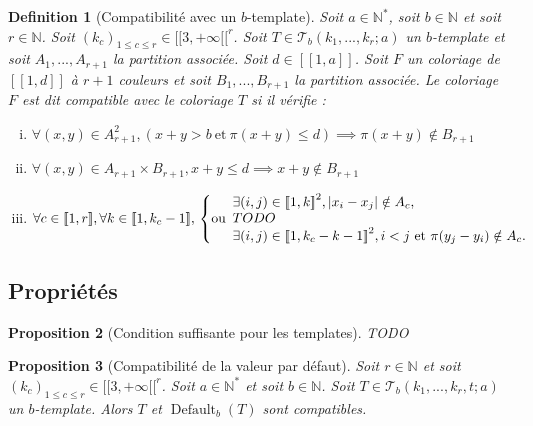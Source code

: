 \documentclass{article}
\newtheorem{definition}{Definition}[section]
\newtheorem{proposition}[definition]{Proposition}
\DeclareMathOperator{\coldef}{Default}
\begin{document}
\begin{definition}[Compatibilité avec un \(b\)-template]
Soit \(a \in \mathbb{N}^*\), soit \(b \in \mathbb{N}\) et soit \(r \in \mathbb{N}\). Soit \((k_c)_{1 \leqslant c \leqslant r} \in {[\![3, + \infty [\![}^r\). Soit \(T \in \mathcal{T}_b(k_1, ..., k_r; a)\) un \(b\)-template et soit \(A_1, ..., A_{r+1}\) la partition associée. Soit \(d \in [\![1, a]\!]\). Soit \(F\) un coloriage de \([\![1, d]\!]\) à \(r +1\) couleurs et soit \(B_1, ..., B_{r + 1}\) la partition associée. Le coloriage \(F\)  est dit compatible avec le coloriage \(T\) si il vérifie :
\begin{enumerate}[(i)]
\item \(\forall (x,y) \in A_{r+1}^2, (x + y > b ~\text{et}~ \pi(x + y) \leqslant d) \implies \pi(x + y)  \notin B_{r+1}\)
\item \(\forall (x,y) \in A_{r+1} \times B_{r+1}, x + y \leqslant d \implies x + y  \notin B_{r+1}\)
\item \(\forall c \in [\![1, r]\!], \forall k \in [\![1, k_c-1]\!], \\
	\left\{ \text{ou} 
	\begin{array}{l}
		\exists (i, j) \in {[\![1, k]\!]}^2, |x_i - x_j| \notin A_c, \\
		TODO \\
		\exists (i, j) \in {[\![1, k_c - k - 1]\!]}^2, i < j ~\text{et}~ \pi(y_j - y_i) \notin A_c.
	\end{array}
	\right.\)
\end{enumerate}
\end{definition}

\subsection{Propriétés}

\begin{proposition}[Condition suffisante pour les templates]
TODO
\end{proposition}

\begin{proposition}[Compatibilité de la valeur par défaut]
Soit \(r \in \mathbb{N}\) et soit \((k_c)_{1 \leqslant c \leqslant r}  \in {[\![3, +\infty[\![}^r\). Soit \(a \in \mathbb{N}^*\) et soit \(b \in \mathbb{N}\). Soit \(T \in \mathcal{T}_b(k_1, ..., k_r, t; a)\) un \(b\)-template. Alors \(T\) et \(\coldef_b(T)\) sont compatibles.
\end{proposition}
\end{document}
